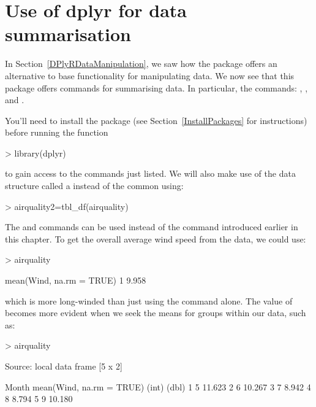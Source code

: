  
 
 
\section{Use of dplyr for data summarisation} 
\label{DPlyRDataSummarisation} 
 
 
In Section~\ref{DPlyRDataManipulation}, we saw how the  package offers an alternative to base \R{} functionality for manipulating data. We now see that this package offers commands for summarising data. In particular, the commands: , , and . 
   
You'll need to install the package (see Section~\ref{InstallPackages} for instructions) before running the function 
\begin{Schunk}
\begin{Sinput}
> library(dplyr) 
\end{Sinput}
\end{Schunk}
to gain access to the commands just listed. We will also make use of the  data structure called a  instead of the common  using: 
\begin{Schunk}
\begin{Sinput}
> airquality2=tbl_df(airquality) 
\end{Sinput}
\end{Schunk}
 
 
The   and  commands can be used instead of the  command introduced earlier in this chapter. To get the overall average wind speed from the  data, we could use: 
\begin{Schunk}
\begin{Sinput}
> airquality %>% summarise(mean(Wind, na.rm = TRUE)) 
\end{Sinput}
\begin{Soutput}
  mean(Wind, na.rm = TRUE)
1                    9.958
\end{Soutput}
\end{Schunk}
which is more long-winded than just using the  command alone. The value of  becomes more evident when we seek the means for groups within our data, such as: 
\begin{Schunk}
\begin{Sinput}
> airquality%>% group_by(Month) %>% summarise(mean(Wind, na.rm = TRUE)) 
\end{Sinput}
\begin{Soutput}
Source: local data frame [5 x 2]

  Month mean(Wind, na.rm = TRUE)
  (int)                    (dbl)
1     5                   11.623
2     6                   10.267
3     7                    8.942
4     8                    8.794
5     9                   10.180
\end{Soutput}
\end{Schunk}
 
